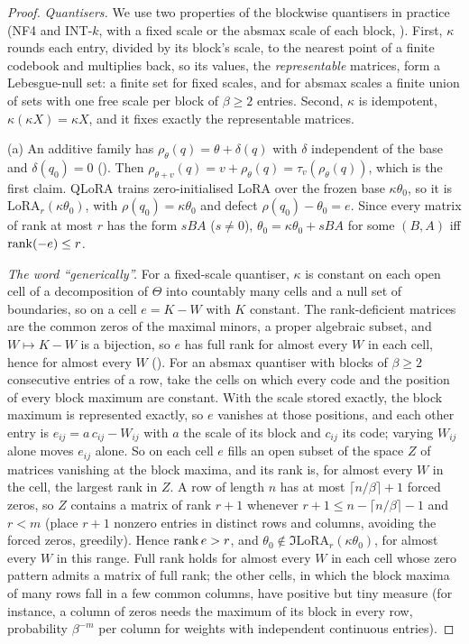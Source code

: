\begin{proof}
\emph{Quantisers.} We use two properties of the blockwise quantisers in practice (NF4 and INT-$k$, with a fixed scale or
the absmax scale of each block, \citealp{dettmers2023qlora,dettmers20218}). First, $\kappa$ rounds each entry, divided by
its block's scale, to the nearest point of a finite codebook and multiplies back, so its values, the \emph{representable}
matrices, form a Lebesgue-null set: a finite set for fixed scales, and for absmax scales a finite union of sets with one
free scale per block of $\beta\ge2$ entries. Second, $\kappa$ is idempotent, $\kappa(\kappa X)=\kappa X$, and it fixes
exactly the representable matrices.

(a) An additive family has $\rho_\theta(q)=\theta+\delta(q)$ with $\delta$ independent of the base and $\delta(q_0)=0$
(). Then $\rho_{\theta+v}(q)=v+\rho_\theta(q)=\tau_v(\rho_\theta(q))$, which is the first claim.
QLoRA trains zero-initialised LoRA over the frozen base $\kappa\theta_0$, so it is $\mathrm{LoRA}_r(\kappa\theta_0)$, with
$\rho(q_0)=\kappa\theta_0$ and defect $\rho(q_0)-\theta_0=e$. Since every matrix of rank at most $r$ has the form $sBA$
($s\ne0$), $\theta_0=\kappa\theta_0+sBA$ for some $(B,A)$ iff $\operatorname{rank}(-e)\le r$.

\emph{The word ``generically''.} For a fixed-scale quantiser, $\kappa$ is constant on each open cell of a decomposition of
$\Theta$ into countably many cells and a null set of boundaries, so on a cell $e=K-W$ with $K$ constant. The rank-deficient
matrices are the common zeros of the maximal minors, a proper algebraic subset, and $W\mapsto K-W$ is a bijection, so $e$
has full rank for almost every $W$ in each cell, hence for almost every $W$ (). For an absmax quantiser with
blocks of $\beta\ge2$ consecutive entries of a row, take the cells on which every code and the position of every block
maximum are constant. With the scale stored exactly, the block maximum is represented exactly, so $e$ vanishes at those positions, and each other
entry is $e_{ij}=a\,c_{ij}-W_{ij}$ with $a$ the scale of its block and $c_{ij}$ its code; varying $W_{ij}$ alone moves
$e_{ij}$ alone. So on each cell $e$ fills an open subset of the space $Z$ of matrices vanishing at the block maxima, and its
rank is, for almost every $W$ in the cell, the largest rank in $Z$. A row of length $n$ has at most $\lceil n/\beta\rceil+1$
forced zeros, so $Z$ contains a matrix of rank $r+1$ whenever $r+1\le n-\lceil n/\beta\rceil-1$ and $r<m$ (place $r+1$
nonzero entries in distinct rows and columns, avoiding the forced zeros, greedily). Hence $\operatorname{rank} e>r$, and
$\theta_0\notin\Im\mathrm{LoRA}_r(\kappa\theta_0)$, for almost every $W$ in this range. Full rank holds for almost every
$W$ in each cell whose zero pattern admits a matrix of full rank; the other cells, in which the block maxima of many rows
fall in a few common columns, have positive but tiny measure (for instance, a column of zeros needs the maximum of its
block in every row, probability $\beta^{-m}$ per column for weights with independent continuous entries).


\end{proof}

